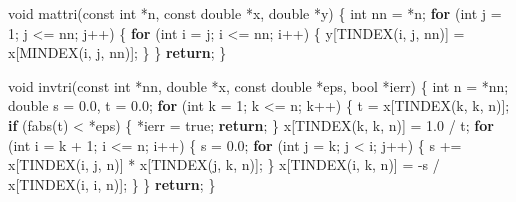 \documentclass[12pt,]{article}
\newenvironment{Shaded}{\begin{snugshade}}{\end{snugshade}}
\newcommand{\ControlFlowTok}[1]{\textcolor[rgb]{0.13,0.29,0.53}{\textbf{#1}}}
\newcommand{\DataTypeTok}[1]{\textcolor[rgb]{0.13,0.29,0.53}{#1}}
\newcommand{\DecValTok}[1]{\textcolor[rgb]{0.00,0.00,0.81}{#1}}
\newcommand{\FloatTok}[1]{\textcolor[rgb]{0.00,0.00,0.81}{#1}}
\newcommand{\NormalTok}[1]{#1}
\begin{document}
\begin{Shaded}
\begin{Highlighting}[]
{{{{{{\DataTypeTok{void}\NormalTok{ mattri(}\DataTypeTok{const} \DataTypeTok{int}\NormalTok{ *n, }\DataTypeTok{const} \DataTypeTok{double}\NormalTok{ *x, }\DataTypeTok{double}\NormalTok{ *y) \{}
  \DataTypeTok{int}\NormalTok{ nn = *n;}
  \ControlFlowTok{for}\NormalTok{ (}\DataTypeTok{int}\NormalTok{ j = }\DecValTok{1}\NormalTok{; j <= nn; j++) \{}
    \ControlFlowTok{for}\NormalTok{ (}\DataTypeTok{int}\NormalTok{ i = j; i <= nn; i++) \{}
\NormalTok{      y[TINDEX(i, j, nn)] = x[MINDEX(i, j, nn)];}
\NormalTok{    \}}
\NormalTok{  \}}
  \ControlFlowTok{return}\NormalTok{;}
\NormalTok{\}}

\DataTypeTok{void}\NormalTok{ invtri(}\DataTypeTok{const} \DataTypeTok{int}\NormalTok{ *nn, }\DataTypeTok{double}\NormalTok{ *x, }\DataTypeTok{const} \DataTypeTok{double}\NormalTok{ *eps, }\DataTypeTok{bool}\NormalTok{ *ierr) \{}
  \DataTypeTok{int}\NormalTok{ n = *nn;}
  \DataTypeTok{double}\NormalTok{ s = }\FloatTok{0.0}\NormalTok{, t = }\FloatTok{0.0}\NormalTok{;}
  \ControlFlowTok{for}\NormalTok{ (}\DataTypeTok{int}\NormalTok{ k = }\DecValTok{1}\NormalTok{; k <= n; k++) \{}
\NormalTok{    t = x[TINDEX(k, k, n)];}
    \ControlFlowTok{if}\NormalTok{ (fabs(t) < *eps) \{}
\NormalTok{      *ierr = true;}
      \ControlFlowTok{return}\NormalTok{;}
\NormalTok{    \}}
\NormalTok{    x[TINDEX(k, k, n)] = }\FloatTok{1.0}\NormalTok{ / t;}
    \ControlFlowTok{for}\NormalTok{ (}\DataTypeTok{int}\NormalTok{ i = k + }\DecValTok{1}\NormalTok{; i <= n; i++) \{}
\NormalTok{      s = }\FloatTok{0.0}\NormalTok{;}
      \ControlFlowTok{for}\NormalTok{ (}\DataTypeTok{int}\NormalTok{ j = k; j < i; j++) \{}
\NormalTok{        s += x[TINDEX(i, j, n)] * x[TINDEX(j, k, n)];}
\NormalTok{      \}}
\NormalTok{      x[TINDEX(i, k, n)] = -s / x[TINDEX(i, i, n)];}
\NormalTok{    \}}
\NormalTok{  \}}
  \ControlFlowTok{return}\NormalTok{;}
\NormalTok{\}}

}}}}}}
\end{Highlighting}
\end{Shaded}
\end{document}
